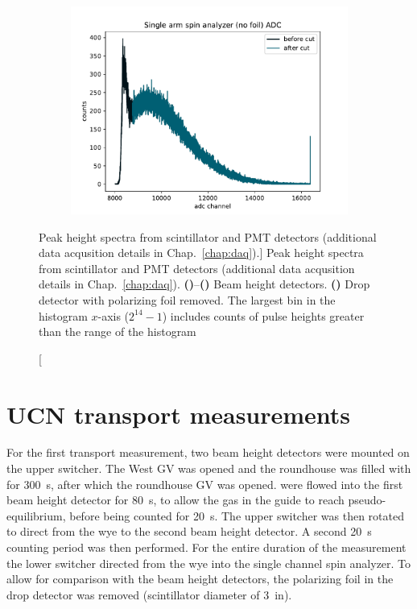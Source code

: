 \begin{figure}
\begin{subfigure}{.5\textwidth}
  \includegraphics[width=\textwidth]{figures/2021_single_arm_no_foil_adc.pdf}
  \caption{}\label{subfig:single_arm_no_foil_adc}
\end{subfigure}
\caption
[Peak height spectra from \BZnS scintillator and PMT detectors (additional data acqusition details in Chap.~\ref{chap:daq}).]
{Peak height spectra from \BZnS scintillator and PMT detectors (additional data acqusition details in Chap.~\ref{chap:daq}). \textbf{()}--\textbf{()} Beam height detectors. \textbf{()} Drop detector with polarizing foil removed. The largest bin in the histogram $x$-axis ($2^{14}-1$) includes counts of pulse heights greater than the range of the histogram}
\label{fig:2021_detector_adc}
\end{figure}


\section{UCN transport measurements}\label{sec:2021_ucn_transport_switchers}


For the first \ucn transport measurement, two beam height detectors were mounted on the upper switcher. The West GV was opened and the roundhouse was filled with \ucn for \qty{300}{s}, after which the roundhouse GV was opened. \ucn were flowed into the first beam height detector for \qty{80}{s}, to allow the \ucn gas in the guide to reach pseudo-equilibrium, before being counted for \qty{20}{s}. The upper switcher was then rotated to direct \ucn from the wye to the second beam height detector. A second \qty{20}{s} counting period was then performed. For the entire duration of the measurement the lower switcher directed \ucn from the wye into the single channel spin analyzer. To allow for comparison with the beam height detectors, the polarizing foil in the drop detector was removed (\BZnS scintillator diameter of \qty{3}{in}).

